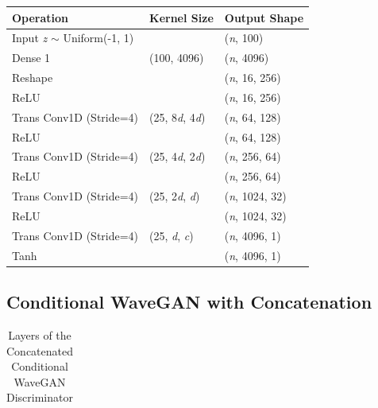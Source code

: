 \documentclass[a4paper, titlepage]{article}
\begin{document}
\begin{appendices}
\begin{table}[ht]
\begin{center}
\begin{tabular}{ l | l | l}
        Operation & Kernel Size & Output Shape \\
        \hline
        Input {\it z} $\sim$ Uniform(-1, 1) & & ({\it n}, 100) \\
        Dense 1 & (100, 4096) & ({\it n}, 4096) \\
        Reshape & & ({\it n}, 16, 256) \\
        ReLU & & ({\it n}, 16, 256) \\
        Trans Conv1D (Stride=4) & (25, 8{\it d}, 4{\it d}) & ({\it n}, 64, 128) \\
        ReLU & & ({\it n}, 64, 128) \\
        Trans Conv1D (Stride=4) & (25, 4{\it d}, 2{\it d}) & ({\it n}, 256, 64) \\
        ReLU & & ({\it n}, 256, 64) \\
        Trans Conv1D (Stride=4) & (25, 2{\it d}, {\it d}) & ({\it n}, 1024, 32) \\
        ReLU & & ({\it n}, 1024, 32) \\
        Trans Conv1D (Stride=4) & (25, {\it d}, {\it c}) & ({\it n}, 4096, 1) \\
        Tanh & & ({\it n}, 4096, 1) \\

      \end{tabular}
    \end{center}
    
  \end{table}

  \clearpage

  \subsection{Conditional WaveGAN with Concatenation}

  \begin{table}[ht]
    
    \caption{Layers of the Concatenated Conditional WaveGAN Discriminator}
    \label{tab:CWGAN_Dis}
    
    \begin{center}
      \begin{tabular}{ l | l | l}
        

\end{tabular}
\end{center}
\end{table}
\end{appendices}
\end{document}
